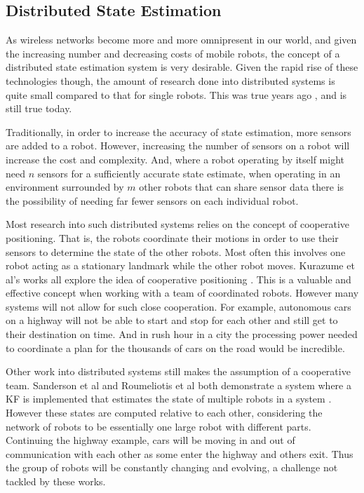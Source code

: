 \documentclass[conference]{IEEEtran}
\begin{document}
\subsection{Distributed State Estimation}
As wireless networks become more and more omnipresent in our world, and given the increasing number and decreasing costs of mobile robots, the concept of a distributed state estimation system is very desirable. Given the rapid rise of these technologies though, the amount of research done into distributed systems is quite small compared to that for single robots. This was true years ago , and is still true today\cite{Parker2000}.

Traditionally, in order to increase the accuracy of state estimation, more sensors are added to a robot. However, increasing the number of sensors on a robot will increase the cost and complexity. And, where a robot operating by itself might need $n$ sensors for a sufficiently accurate state estimate, when operating in an environment surrounded by $m$ other robots that can share sensor data there is the possibility of needing far fewer sensors on each individual robot.

Most research into such distributed systems relies on the concept of cooperative positioning. That is, the robots coordinate their motions in order to use their sensors to determine the state of the other robots. Most often this involves one robot acting as a stationary landmark while the other robot moves. Kurazume et al's works all explore the idea of cooperative positioning\cite{Kurazume1994}\cite{Kurazume1996}\cite{Kurazume1998} \cite{Kurazume2000}. This is a valuable and effective concept when working with a team of coordinated robots. However many systems will not allow for such close cooperation. For example, autonomous cars on a highway will not be able to start and stop for each other and still get to their destination on time. And in rush hour in a city the processing power needed to coordinate a plan for the thousands of cars on the road would be incredible.

Other work into distributed systems still makes the assumption of a cooperative team. Sanderson et al and Roumeliotis et al both demonstrate a system where a KF is implemented that estimates the state of multiple robots in a system \cite{Sanderson1997}\cite{Roumeliotis2002}. However these states are computed relative to each other, considering the network of robots to be essentially one large robot with different parts. Continuing the highway example, cars will be moving in and out of communication with each other as some enter the highway and others exit. Thus the group of robots will be constantly changing and evolving, a challenge not tackled by these works.
\end{document}
